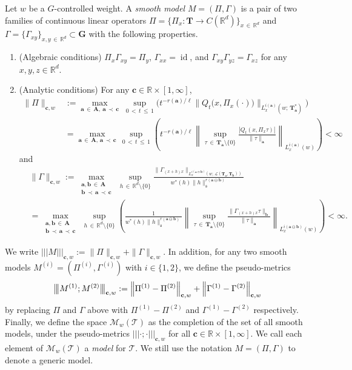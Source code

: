 \documentclass[AHL,Unicode,longabstracts,published]{cedram}
\newcommand{\bbR}{\mathbb{R}}
\newcommand{\mfs}{\mathfrak{s}}
\newcommand{\wco}{w^*}
\newcommand{\bfa}{\mathbf{a}}
\newcommand{\bfb}{\mathbf{b}}
\newcommand{\bfc}{\mathbf{c}}
\newcommand{\bfaob}{\mathbf{a}\ominus\mathbf{b}}
\newcommand{\bfA}{\mathbf{A}}
\newcommand{\bfT}{\mathbf{T}}
\newcommand{\bfG}{\mathbf{G}}
\newcommand{\mcL}{\mathcal{L}}
\newcommand{\scT}{\mathscr{T}}
\newcommand{\scM}{\mathscr{M}}
\DeclareMathOperator{\id}{id}
\newcommand{\tri}{|\!|\!|}
\newcommand{\bigtri}{\big|\mkern -2.7mu\big|\mkern -2.7mu\big|}
\begin{document}
\begin{defi}
Let $w$ be a $G$-controlled weight. A \emph{smooth model} $M=(\Pi,\Gamma)$ is a pair of two families of continuous linear operators $\Pi=\{\Pi_x:\bfT\to C(\bbR^d)\}_{x\,\in\,\bbR^d}$ and $\Gamma=\{\Gamma_{xy}\}_{x,y\,\in\,\bbR^d}\subset \bfG$ with the following properties.
\begin{enumerate}
\item (Algebraic conditions) $\Pi_x\Gamma_{xy}=\Pi_y$, $\Gamma_{xx}=\id$, and $\Gamma_{xy}\Gamma_{yz}=\Gamma_{xz}$ for any $x,y,z\in\bbR^d$.
\item (Analytic conditions) For any $\bfc\in\bbR\times[1,\infty]$,
\begin{align*}
\|\Pi\|_{\bfc,w}&:=\max_{\bfa\,\in\,\bfA,\: \bfa\,\prec\,\bfc}\;
\sup_{0\,<\,t\,\le\,1}
\Big(t^{-r(\bfa)/\ell}\big\|Q_t\big(x,\Pi_x(\cdot)\big)\big\|_{L_x^{i(\bfa)}\left(w;\,\bfT_{\bfa}^*\right)}\Big)
\\
&=\max_{\bfa\,\in\,\bfA,\, \bfa\,\prec\,\bfc}\,
\sup_{0\,<\,t\,\le\,1}
\left(t^{-r(\bfa)/\ell}
\left\|
\sup_{\tau\,\in\,\bfT_{\bfa}\setminus\{0\}}
\frac{|Q_t(x,\Pi_x\tau)|}{\|\tau\|_{\bfa}}
\right\|_{L_x^{i(\bfa)}(w)}\right)<\infty
\end{align*}
and
\begin{align*}
&\|\Gamma\|_{\bfc,w}:=\max_{\substack{\bfa,\bfb\,\in\,\bfA\\ \bfb\,\prec\,\bfa\,\prec\,\bfc}}\,
\sup_{h\,\in\,\bbR^d\setminus\{0\}}
\frac{\|\Gamma_{(x+h)x}\|_{L_x^{i(\bfaob)}\left(w;\,\mcL(\bfT_{\bfa},\bfT_{\bfb})\right)}}{\wco(h)\|h\|_\mfs^{r(\bfaob)}}\\
&=\max_{\substack{\bfa,\bfb\,\in\,\bfA\\ \bfb\,\prec\,\bfa\,\prec\,\bfc}}\,
\sup_{h\,\in\,\bbR^d\setminus\{0\}}\left(
\frac{1}{\wco(h)\|h\|_\mfs^{r(\bfaob)}}
\left\|
\sup_{\tau\,\in\,\bfT_{\bfa}\setminus\{0\}}
\frac{\|\Gamma_{(x+h)x}\tau\|_{\bfb}}{\|\tau\|_{\bfa}}
\right\|_{L_x^{i(\bfaob)}(w)}\right)<\infty.
\end{align*}
\end{enumerate}
We write $\tri M\tri_{\bfc,w}:=\|\Pi\|_{\bfc,w}+\|\Gamma\|_{\bfc,w}$. In addition, for any two smooth models $M^{(i)}=(\Pi^{(i)},\Gamma^{(i)})$ with $i\in\{1,2\}$, we define the pseudo-metrics
\[
\bigtri M^{(1)};M^{(2)}\bigtri_{\bfc,w}:=\left\|\Pi^{(1)}-\Pi^{(2)}\right\|_{\bfc,w}+\left\|\Gamma^{(1)}-\Gamma^{(2)}\right\|_{\bfc,w}
\]
by replacing $\Pi$ and $\Gamma$ above with $\Pi^{(1)}-\Pi^{(2)}$ and $\Gamma^{(1)}-\Gamma^{(2)}$ respectively. Finally, we define the space $\scM_w(\scT)$ as the completion of the set of all smooth models, under the pseudo-metrics $\tri\cdot;\cdot\tri_{\bfc,w}$ for all $\bfc\in\bbR\times[1,\infty]$. We call each element of $\scM_w(\scT)$ a \emph{model} for $\scT$. We still use the notation $M=(\Pi,\Gamma)$ to denote a generic model.
\end{defi}
\end{document}
